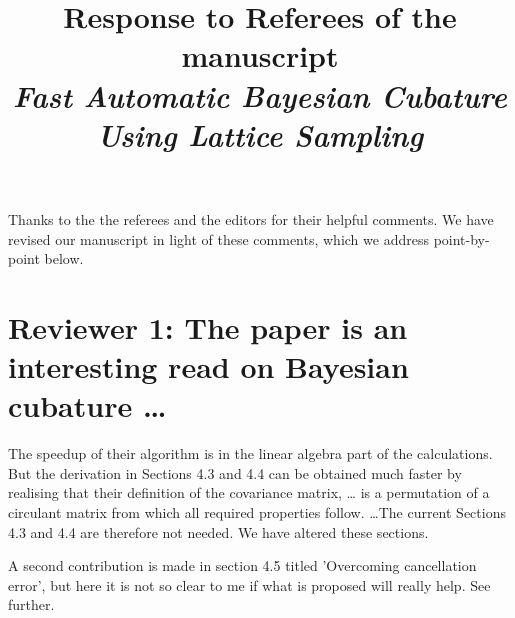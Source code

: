 \documentclass{amsart}
\begin{document}
\title[Response for Fast Automatic Bayesian Cubature]{Response to Referees of the manuscript \\
\emph{Fast Automatic Bayesian Cubature Using Lattice Sampling}}
\maketitle

\newcommand{\Response}[1]{{\color{blue}#1}}
\renewcommand{\vec}[1]{\boldsymbol{#1}}

Thanks to the the referees and the editors for their helpful comments.  We have revised our manuscript in light of these comments, which we address point-by-point below.

\section*{Reviewer 1: The paper is an interesting read on Bayesian cubature \ldots}

The speedup of their algorithm is in the linear algebra part of the
calculations. But the derivation in Sections 4.3 and 4.4 can be obtained much
faster by realising that their definition of the covariance matrix, \ldots 
is a permutation of a circulant matrix from which all required properties follow. \ldots The current Sections 4.3 and 4.4 are therefore not
needed. \Response{We have altered these sections.}

A second contribution is made in section 4.5 titled 'Overcoming cancellation
error', but here it is not so clear to me if what is proposed will really help.
See further.
\end{document}
